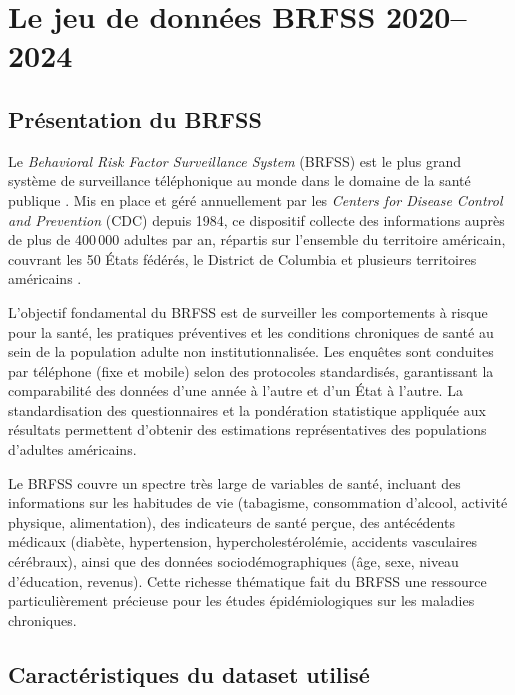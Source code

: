 \documentclass[12pt,a4paper]{report}
\begin{document}
\section{Le jeu de données BRFSS 2020--2024}

\subsection{Présentation du BRFSS}

Le \textit{Behavioral Risk Factor Surveillance System} (\acs{BRFSS}) est le plus
grand système de surveillance téléphonique au monde dans le domaine de la santé
publique \cite{mokdad2003}. Mis en place et géré annuellement par les
\textit{Centers for Disease Control and Prevention} (\acs{CDC}) depuis 1984, ce
dispositif collecte des informations auprès de plus de 400\,000 adultes par an,
répartis sur l'ensemble du territoire américain, couvrant les 50 États fédérés, le
District de Columbia et plusieurs territoires américains \cite{cdc2024}.

L'objectif fondamental du \acs{BRFSS} est de surveiller les comportements à risque
pour la santé, les pratiques préventives et les conditions chroniques de santé au
sein de la population adulte non institutionnalisée. Les enquêtes sont conduites par
téléphone (fixe et mobile) selon des protocoles standardisés, garantissant la
comparabilité des données d'une année à l'autre et d'un État à l'autre. La
standardisation des questionnaires et la pondération statistique appliquée aux
résultats permettent d'obtenir des estimations représentatives des populations
d'adultes américains.

Le \acs{BRFSS} couvre un spectre très large de variables de santé, incluant des
informations sur les habitudes de vie (tabagisme, consommation d'alcool, activité
physique, alimentation), des indicateurs de santé perçue, des antécédents médicaux
(diabète, hypertension, hypercholestérolémie, accidents vasculaires cérébraux),
ainsi que des données sociodémographiques (âge, sexe, niveau d'éducation, revenus).
Cette richesse thématique fait du \acs{BRFSS} une ressource particulièrement
précieuse pour les études épidémiologiques sur les maladies chroniques.

\subsection{Caractéristiques du dataset utilisé}
\end{document}
